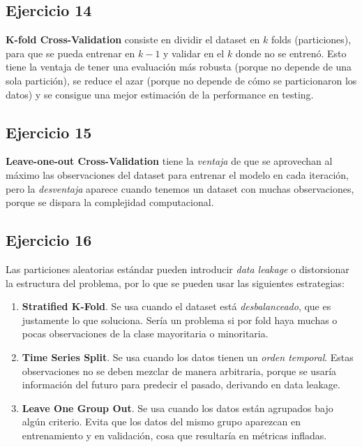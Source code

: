\documentclass[a4paper,12pt]{article}
\begin{document}
        \subsection*{Ejercicio 14}
            \noindent \textbf{K-fold Cross-Validation} consiste en dividir el dataset en $k$ folds (particiones), para que se pueda entrenar en $k-1$ y validar en el $k$ donde no se entrenó. Esto tiene la ventaja de tener una evaluación más robusta (porque no depende de una sola partición), se reduce el azar (porque no depende de cómo se particionaron los datos) y se consigue una mejor estimación de la performance en testing.
        \subsection*{Ejercicio 15}
            \noindent \textbf{Leave-one-out Cross-Validation} tiene la \emph{ventaja} de que se aprovechan al máximo las observaciones del dataset para entrenar el modelo en cada iteración, pero la \emph{desventaja} aparece cuando tenemos un dataset con muchas observaciones, porque se dispara la complejidad computacional.
        \subsection*{Ejercicio 16}
            \noindent Las particiones aleatorias estándar pueden introducir \emph{data leakage} o distorsionar la estructura del problema, por lo que se pueden usar las siguientes estrategias:
        \begin{enumerate}
            \item \textbf{Stratified K-Fold}. Se usa cuando el dataset está \emph{desbalanceado}, que es justamente lo que soluciona. Sería un problema si por fold haya muchas o pocas observaciones de la clase mayoritaria o minoritaria.
            \item \textbf{Time Series Split}. Se usa cuando los datos tienen un \emph{orden temporal}. Estas observaciones no se deben mezclar de manera arbitraria, porque se usaría información del futuro para predecir el pasado, derivando en data leakage.
            \item \textbf{Leave One Group Out}. Se usa cuando los datos están agrupados bajo algún criterio. Evita que los datos del mismo grupo aparezcan en entrenamiento y en validación, cosa que resultaría en métricas infladas.
        \end{enumerate}
\end{document}
